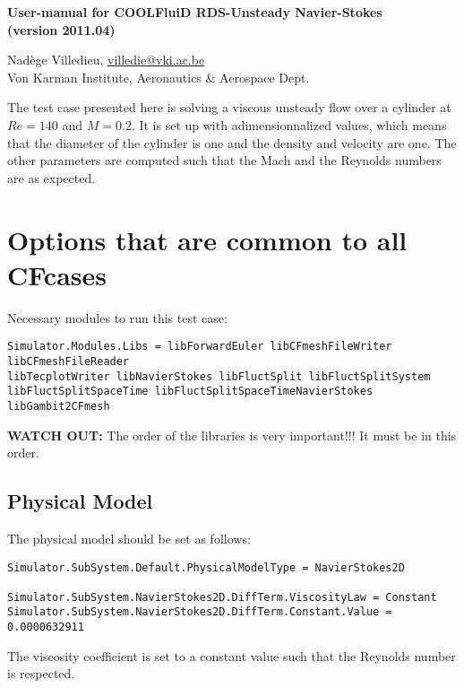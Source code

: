 \documentclass[11pt]{article}
\begin{document}
\pagestyle{empty}

\begin{center}
  {\fontsize{14}{20}\bf 
    User-manual for COOLFluiD RDS-Unsteady Navier-Stokes \\
    (version 2011.04) \\[10pt]}
\end{center}

\begin{center}
  {Nad\`{e}ge Villedieu, \underline{villedie@vki.ac.be} \\
    Von Karman Institute, Aeronautics \& Aerospace Dept.}
\end{center}

The test case presented here is solving a viscous unsteady flow over a cylinder at $Re=140$ and $M=0.2$. It is set up with adimensionnalized values, which means that the diameter of the cylinder 
is one and the density and velocity are one. The other parameters are computed such that the Mach and the Reynolds numbers are as expected.

\section{Options that are common to all CFcases}

Necessary modules to run this test case:
\begin{verbatim}
Simulator.Modules.Libs = libForwardEuler libCFmeshFileWriter libCFmeshFileReader 
libTecplotWriter libNavierStokes libFluctSplit libFluctSplitSystem 
libFluctSplitSpaceTime libFluctSplitSpaceTimeNavierStokes libGambit2CFmesh
\end{verbatim}
{\bf WATCH OUT:} The order of the libraries is very important!!! It must be in this order.


\subsection{Physical Model}
The physical model should be set as follows:
\begin{verbatim}
Simulator.SubSystem.Default.PhysicalModelType = NavierStokes2D

Simulator.SubSystem.NavierStokes2D.DiffTerm.ViscosityLaw = Constant
Simulator.SubSystem.NavierStokes2D.DiffTerm.Constant.Value = 0.0000632911
\end{verbatim}
The viscosity coefficient is set to a constant value such that the Reynolds number is
respected.
\end{document}
